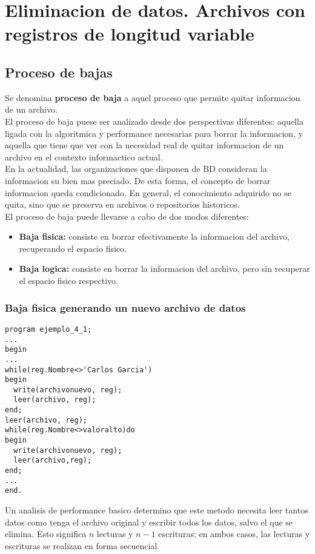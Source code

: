 \section{Eliminacion de datos. Archivos con registros de longitud variable}

\subsection{Proceso de bajas}
Se denomina \textbf{proceso de baja} a aquel proceso que permite quitar informacion de un archivo.\\
El proceso de baja puese ser analizado desde dos perspectivas diferentes: aquella ligada con la algoritmica y performance necesarias para borrar la informacion, y aquella que tiene que ver con la necesidad real de quitar informacion de un archivo en el contexto informactico actual.\\
En la actualidad, las organizaciones que disponen de BD consideran la informacion su bien mas preciado. De esta forma, el concepto de borrar informacion queda condicionado. En general, el conocimiento adquirido no se quita, sino que se preserva en archivos o repositorios historicos.\\
El proceso de baja puede llevarse a cabo de dos modos diferentes:
\begin{itemize}
  \item \textbf{Baja fisica: }consiste en borrar efectivamente la informacion del archivo, recuperando el espacio fisico.
  \item \textbf{Baja logica: }consiste en borrar la informacion del archivo, pero sin recuperar el espacio fisico respectivo.
\end{itemize}

\subsubsection{Baja fisica generando un nuevo archivo de datos}
\begin{lstlisting}
program ejemplo_4_1;
...
begin
...
while(reg.Nombre<>'Carlos Garcia')
begin
  write(archivonuevo, reg);
  leer(archivo, reg);
end;
leer(archivo, reg);
while(reg.Nombre<>valoralto)do
begin
  write(archivonuevo, reg);
  leer(archivo,reg);
end;
...
end.
\end{lstlisting}
Un analisis de performance basico determino que este metodo necesita leer tantos datos como tenga el archivo original y escribir todos los datos, salvo el que se elimina. Esto significa $n$ lecturas y $n-1$ escrituras; en ambos casos, las lecturas y escrituras se realizan en forma secuencial.

